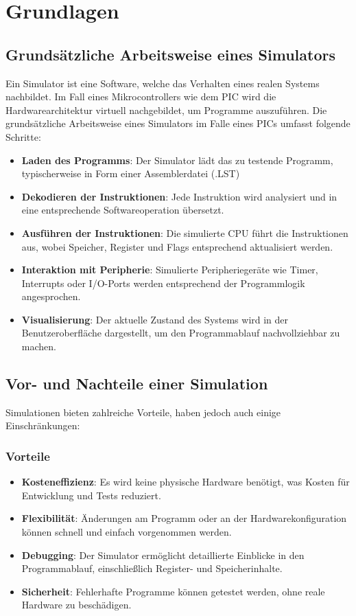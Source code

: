 
\chapter{Grundlagen}

\section{Grundsätzliche Arbeitsweise eines Simulators}

Ein Simulator ist eine Software, welche das Verhalten eines realen Systems nachbildet. Im Fall eines Mikrocontrollers wie dem PIC wird die Hardwarearchitektur virtuell nachgebildet, um Programme auszuführen. Die grundsätzliche Arbeitsweise eines Simulators im Falle eines PICs umfasst folgende Schritte:

\begin{itemize}
    \item \textbf{Laden des Programms}: Der Simulator lädt das zu testende Programm, typischerweise in Form einer Assemblerdatei (.LST) 
    \item \textbf{Dekodieren der Instruktionen}: Jede Instruktion wird analysiert und in eine entsprechende Softwareoperation übersetzt.
    \item \textbf{Ausführen der Instruktionen}: Die simulierte CPU führt die Instruktionen aus, wobei Speicher, Register und Flags entsprechend aktualisiert werden.
    \item \textbf{Interaktion mit Peripherie}: Simulierte Peripheriegeräte wie Timer, Interrupts oder I/O-Ports werden entsprechend der Programmlogik angesprochen.
    \item \textbf{Visualisierung}: Der aktuelle Zustand des Systems wird in der Benutzeroberfläche dargestellt, um den Programmablauf nachvollziehbar zu machen.
\end{itemize}

\section{Vor- und Nachteile einer Simulation}

Simulationen bieten zahlreiche Vorteile, haben jedoch auch einige Einschränkungen:

\subsection*{Vorteile}
\begin{itemize}
    \item \textbf{Kosteneffizienz}: Es wird keine physische Hardware benötigt, was Kosten für Entwicklung und Tests reduziert.
    \item \textbf{Flexibilität}: Änderungen am Programm oder an der Hardwarekonfiguration können schnell und einfach vorgenommen werden.
    \item \textbf{Debugging}: Der Simulator ermöglicht detaillierte Einblicke in den Programmablauf, einschließlich Register- und Speicherinhalte.
    \item \textbf{Sicherheit}: Fehlerhafte Programme können getestet werden, ohne reale Hardware zu beschädigen.
\end{itemize}

